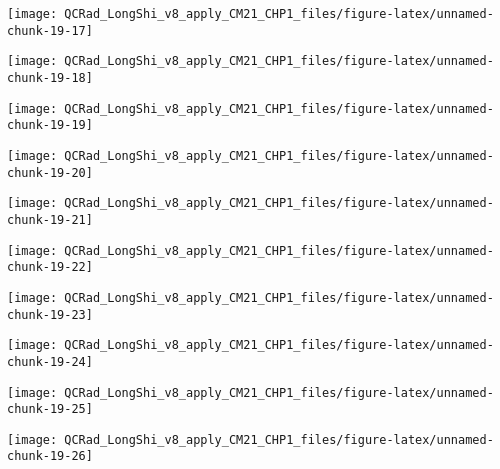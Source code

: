 \documentclass[
  10pt,
  a4paper,oneside]{article}
\begin{document}
\begin{center}\texttt{[image: QCRad\_LongShi\_v8\_apply\_CM21\_CHP1\_files/figure-latex/unnamed-chunk-19-17]} \end{center}

\begin{center}\texttt{[image: QCRad\_LongShi\_v8\_apply\_CM21\_CHP1\_files/figure-latex/unnamed-chunk-19-18]} \end{center}

\begin{center}\texttt{[image: QCRad\_LongShi\_v8\_apply\_CM21\_CHP1\_files/figure-latex/unnamed-chunk-19-19]} \end{center}

\begin{center}\texttt{[image: QCRad\_LongShi\_v8\_apply\_CM21\_CHP1\_files/figure-latex/unnamed-chunk-19-20]} \end{center}

\begin{center}\texttt{[image: QCRad\_LongShi\_v8\_apply\_CM21\_CHP1\_files/figure-latex/unnamed-chunk-19-21]} \end{center}

\begin{center}\texttt{[image: QCRad\_LongShi\_v8\_apply\_CM21\_CHP1\_files/figure-latex/unnamed-chunk-19-22]} \end{center}

\begin{center}\texttt{[image: QCRad\_LongShi\_v8\_apply\_CM21\_CHP1\_files/figure-latex/unnamed-chunk-19-23]} \end{center}

\begin{center}\texttt{[image: QCRad\_LongShi\_v8\_apply\_CM21\_CHP1\_files/figure-latex/unnamed-chunk-19-24]} \end{center}

\begin{center}\texttt{[image: QCRad\_LongShi\_v8\_apply\_CM21\_CHP1\_files/figure-latex/unnamed-chunk-19-25]} \end{center}

\begin{center}\texttt{[image: QCRad\_LongShi\_v8\_apply\_CM21\_CHP1\_files/figure-latex/unnamed-chunk-19-26]} \end{center}
\end{document}
